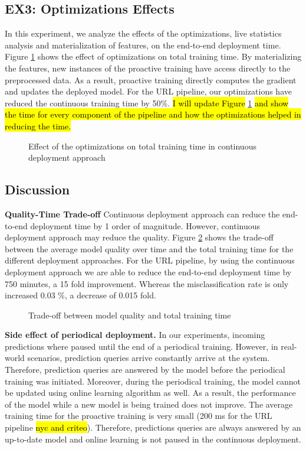 \subsection{EX3: Optimizations Effects}
In this experiment, we analyze the effects of the optimizations, live statistics analysis and materialization of features, on the end-to-end deployment time.
Figure \ref{optimization-effect} shows the effect of optimizations on total training time.
By materializing the features, new instances of the proactive training have access directly to the preprocessed data.
As a result, proactive training directly computes the gradient and updates the deployed model.
For the URL pipeline, our optimizations have reduced the continuous training time by 50\%.
\hl{I will update Figure} \ref{optimization-effect} \hl{and show the time for every component of the pipeline and how the optimizations helped in reducing the time.}
\begin{figure}[h!]
\centering
\resizebox{\columnwidth}{!}{}
\caption{Effect of the optimizations on total training time in continuous deployment approach}
\label{optimization-effect}
\end{figure}

\subsection{Discussion} \label{subsec:discussion}
\textbf{Quality-Time Trade-off}
Continuous deployment approach can reduce the end-to-end deployment time by 1 order of magnitude.
However, continuous deployment approach may reduce the quality.
Figure \ref{quality-vs-time} shows the trade-off between the average model quality over time and the total training time for the different deployment approaches.
For the URL pipeline, by using the continuous deployment approach we are able to reduce the end-to-end deployment time by 750 minutes, a 15 fold improvement.
Whereas the misclassification rate is only increased 0.03 \%, a decrease of 0.015 fold.

\begin{figure}[!h]
\centering
\resizebox{\columnwidth}{!}{}
\caption{Trade-off between model quality and total training time}
\label{quality-vs-time}
\end{figure}


\textbf{Side effect of periodical deployment.}
In our experiments, incoming predictions where paused until the end of a periodical training.
However, in real-world scenarios, prediction queries arrive constantly arrive at the system.
Therefore, prediction queries are answered by the model before the periodical training was initiated. 
Moreover, during the periodical training, the model cannot be updated using online learning algorithm as well.
As a result, the performance of the model while a new model is being trained does not improve.
The average training time for the proactive training is very small (200 ms for the URL pipeline \hl{nyc and criteo}).
Therefore, predictions queries are always answered by an up-to-date model and online learning is not paused in the continuous deployment.


